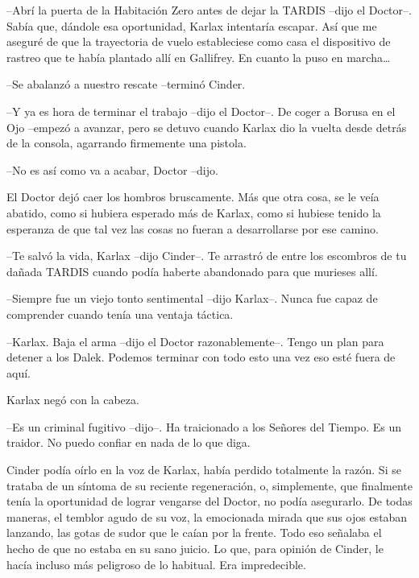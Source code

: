 --Abrí la puerta de la Habitación Zero antes de dejar la TARDIS --dijo el Doctor--. Sabía que, dándole esa oportunidad, Karlax intentaría escapar. Así que me aseguré de que la trayectoria de vuelo estableciese como casa el dispositivo de rastreo que te había plantado allí en Gallifrey. En cuanto la puso en marcha…



--Se abalanzó a nuestro rescate --terminó Cinder.



--Y ya es hora de terminar el trabajo --dijo el Doctor--. De coger a Borusa en el Ojo --empezó a avanzar, pero se detuvo cuando Karlax dio la vuelta desde detrás de la consola, agarrando firmemente una pistola.



--No es así como va a acabar, Doctor --dijo.



El Doctor dejó caer los hombros bruscamente. Más que otra cosa, se le veía abatido, como si hubiera esperado más de Karlax, como si hubiese tenido la esperanza de que tal vez las cosas no fueran a desarrollarse por ese camino.



--Te salvó la vida, Karlax --dijo Cinder--. Te arrastró de entre los escombros de tu dañada TARDIS cuando podía haberte abandonado para que murieses allí.



--Siempre fue un viejo tonto sentimental --dijo Karlax--. Nunca fue capaz de comprender cuando tenía una ventaja táctica.



--Karlax. Baja el arma --dijo el Doctor razonablemente--. Tengo un plan para detener a los Dalek. Podemos terminar con todo esto una vez eso esté fuera de aquí.



Karlax negó con la cabeza. 



--Es un criminal fugitivo --dijo--. Ha traicionado a los Señores del Tiempo. Es un traidor. No puedo confiar en nada de lo que diga.



Cinder podía oírlo en la voz de Karlax, había perdido totalmente la razón. Si se trataba de un síntoma de su reciente regeneración, o, simplemente, que finalmente tenía la oportunidad de lograr vengarse del Doctor, no podía asegurarlo. De todas maneras, el temblor agudo de su voz, la emocionada mirada que sus ojos estaban lanzando, las gotas de sudor que le caían por la frente. Todo eso señalaba el hecho de que no estaba en su sano juicio. Lo que, para opinión de Cinder, le hacía incluso más peligroso de lo habitual. Era impredecible.



